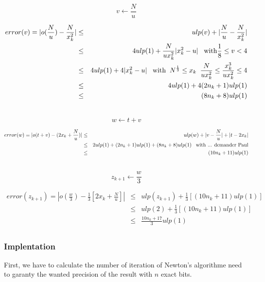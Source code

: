 \documentclass[12pt]{amsart}
\begin{document}
\[
v \leftarrow \frac{N}{u}
\]

\begin{eqnarray}\nonumber
  error(v) = |o(\frac{N}{u})-\frac{N}{x_k^2}| &\leq& ulp(v) +
  |\frac{N}{u}-\frac{N}{x_k^2}|\\\nonumber
         &\leq& 4 ulp(1) + \frac{N}{u
           x_k^2}|x_k^2-u|\;\;\;{\textnormal{with}} \frac{1}{8}\leq v <4\\\nonumber
         &\leq& 4 ulp(1) + 4 |x_k^2-u|\;\;\;{\textnormal{with}} \;\;N^{\frac{1}{3}} \leq x_k\;\;\frac{N}{u
           x_k^2} \leq \frac{x_k^3}{u x_k^2}\leq 4
         \\\nonumber
         &\leq& 4 ulp(1) + 4(2 n_k + 1) ulp(1)\\\nonumber
         &\leq& (8 n_k + 8) ulp(1)\\\nonumber
\end{eqnarray}


\[
w \leftarrow t+v
\]

\begin{eqnarray}\nonumber
  error(w) = |o(t+v)-(2x_k + \frac{N}{u})| &\leq& ulp(w) +
  |v-\frac{N}{u}|+|t-2x_k|\\\nonumber
  &\leq& 2ulp(1) +(2 n_k + 1) ulp(1)  + (8 n_k + 8)
  ulp(1)\;\;\;{\textnormal{with ... demander Paul}}\\\nonumber
  &\leq& (10 n_k + 11) ulp(1)\\\nonumber  
\end{eqnarray}

\[
z_{k+1} \leftarrow \frac{w}{3}
\]

\begin{eqnarray}\label{errsize}
  error(z_{k+1}) = |o(\frac{w}{3})-\frac{1}{3}[2x_k + \frac{N}{u}]| &\leq& ulp(z_{k+1}) +
  \frac{1}{3}[(10 n_k + 11) ulp(1)]\\\nonumber  
&\leq& ulp(2) + \frac{1}{3}[(10 n_k + 11) ulp(1)]\\\nonumber  
  &\leq& \frac{10 n_k + 17}{3} ulp(1)\\\nonumber  
\end{eqnarray}



\subsubsection{Implentation}

First, we have to calculate the number of iteration of Newton's
algorithme need to garanty the wanted precision of the result with $n$ exact bits.
\end{document}

